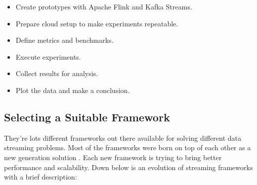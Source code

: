 \begin{itemize}
    \item Create prototypes with Apache Flink and Kafka Streams.
    \item Prepare cloud setup to make experiments repeatable.
    \item Define metrics and benchmarks.
    \item Execute experiments.
    \item Collect results for analysis.
    \item Plot the data and make a conclusion.
\end{itemize}


\subsection{Selecting a Suitable Framework}\label{subsec:selecting-a-suitable-framework}
They're lots different frameworks out there available for solving different
data streaming problems.
Most of the frameworks were born on top of each other as a new generation solution \cite{fragkoulis2023survey}.
Each new framework is trying to bring better performance and scalability.
Down below is an evolution of streaming frameworks \cite{stream_processing_history} with a brief description:

